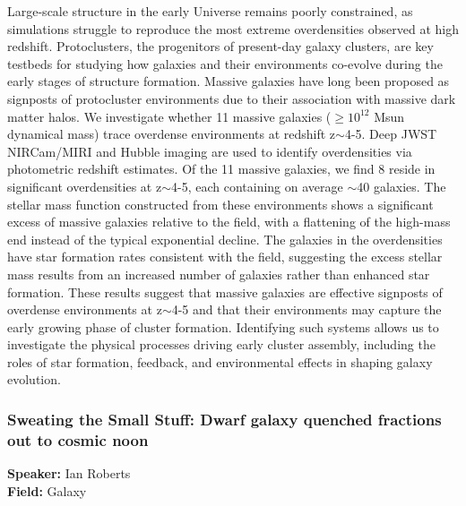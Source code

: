 Large-scale structure in the early Universe remains poorly constrained, as simulations struggle to reproduce the most extreme overdensities observed at high redshift. Protoclusters, the progenitors of present-day galaxy clusters, are key testbeds for studying how galaxies and their environments co-evolve during the early stages of structure formation. Massive galaxies have long been proposed as signposts of protocluster environments due to their association with massive dark matter halos. We investigate whether 11 massive galaxies ($\geq 10^{12}$ Msun dynamical mass) trace overdense environments at redshift z$\sim$4-5. Deep JWST NIRCam/MIRI and Hubble imaging are used to identify overdensities via photometric redshift estimates. Of the 11 massive galaxies, we find 8 reside in significant overdensities at z$\sim$4-5, each containing on average $\sim$40 galaxies. The stellar mass function constructed from these environments shows a significant excess of massive galaxies relative to the field, with a flattening of the high-mass end instead of the typical exponential decline. The galaxies in the overdensities have star formation rates consistent with the field, suggesting the excess stellar mass results from an increased number of galaxies rather than enhanced star formation. These results suggest that massive galaxies are effective signposts of overdense environments at z$\sim$4-5 and that their environments may capture the early growing phase of cluster formation. Identifying such systems allows us to investigate the physical processes driving early cluster assembly, including the roles of star formation, feedback, and environmental effects in shaping galaxy evolution.

\hypertarget{abstract-talk-178}{}\label{abstract-page-talk-178}
\subsubsection*{Sweating the Small Stuff: Dwarf galaxy quenched fractions out to cosmic noon}
\textbf{Speaker:} Ian Roberts\\
\textbf{Field:} Galaxy

